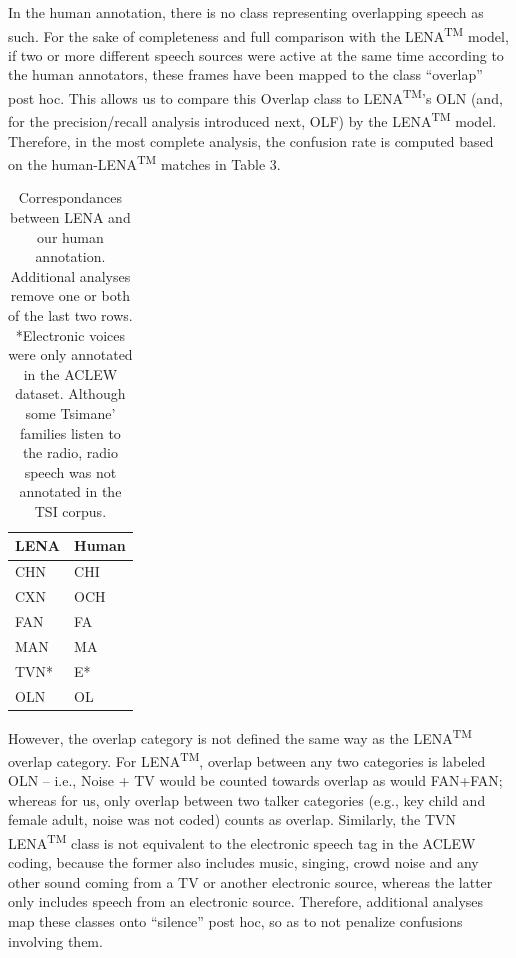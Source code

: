 \documentclass[english,floatsintext,man]{apa6}
\begin{document}
In the human annotation, there is no class representing overlapping
speech as such. For the sake of completeness and full comparison with
the LENA\textsuperscript{TM} model, if two or more different speech
sources were active at the same time according to the human annotators,
these frames have been mapped to the class \enquote{overlap} post hoc.
This allows us to compare this Overlap class to
LENA\textsuperscript{TM}'s OLN (and, for the precision/recall analysis
introduced next, OLF) by the LENA\textsuperscript{TM} model. Therefore,
in the most complete analysis, the confusion rate is computed based on
the human-LENA\textsuperscript{TM} matches in Table 3.

\begin{table}[t]

\caption{\label{tab:tab-tsicor}Correspondances between LENA and our human annotation. Additional analyses remove one or both of the last two rows. *Electronic voices were only annotated in the ACLEW dataset. Although some Tsimane' families listen to the radio, radio speech was not annotated in the TSI corpus.}
\centering
\begin{tabular}{>{\raggedright\arraybackslash}p{2cm}>{\raggedright\arraybackslash}p{2cm}}
\toprule
LENA & Human\\
\midrule
CHN & CHI\\
CXN & OCH\\
FAN & FA\\
MAN & MA\\
TVN* & E*\\
\addlinespace
OLN & OL\\
\bottomrule
\end{tabular}
\end{table}

However, the overlap category is not defined the same way as the
LENA\textsuperscript{TM} overlap category. For LENA\textsuperscript{TM},
overlap between any two categories is labeled OLN -- i.e., Noise + TV
would be counted towards overlap as would FAN+FAN; whereas for us, only
overlap between two talker categories (e.g., key child and female adult,
noise was not coded) counts as overlap. Similarly, the TVN
LENA\textsuperscript{TM} class is not equivalent to the electronic
speech tag in the ACLEW coding, because the former also includes music,
singing, crowd noise and any other sound coming from a TV or another
electronic source, whereas the latter only includes speech from an
electronic source. Therefore, additional analyses map these classes onto
\enquote{silence} post hoc, so as to not penalize confusions involving
them.
\end{document}
